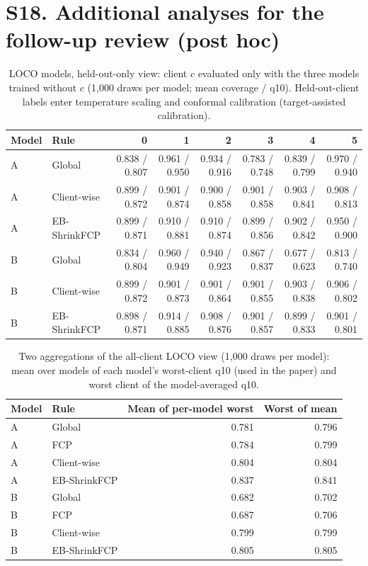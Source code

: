 \documentclass[10pt]{article}
\begin{document}
\section*{S18. Additional analyses for the follow-up review (post hoc)}
\begin{table}[!htbp]
\centering
\scriptsize
\caption{LOCO models, held-out-only view: client $c$ evaluated only with the three models trained without $c$ (1,000 draws per model; mean coverage / q10). Held-out-client labels enter temperature scaling and conformal calibration (target-assisted calibration).}
\label{tab:s18a}
\begin{tabular}{@{}llrrrrrr@{}}
\toprule
Model & Rule & 0 & 1 & 2 & 3 & 4 & 5 \\
\midrule
A & Global & 0.838 / 0.807 & 0.961 / 0.950 & 0.934 / 0.916 & 0.783 / 0.748 & 0.839 / 0.799 & 0.970 / 0.940 \\
A & Client-wise & 0.899 / 0.872 & 0.901 / 0.874 & 0.900 / 0.858 & 0.901 / 0.858 & 0.903 / 0.841 & 0.908 / 0.813 \\
A & EB-ShrinkFCP & 0.899 / 0.871 & 0.910 / 0.881 & 0.910 / 0.874 & 0.899 / 0.856 & 0.902 / 0.842 & 0.950 / 0.900 \\
\midrule
B & Global & 0.834 / 0.804 & 0.960 / 0.949 & 0.940 / 0.923 & 0.867 / 0.837 & 0.677 / 0.623 & 0.813 / 0.740 \\
B & Client-wise & 0.899 / 0.872 & 0.901 / 0.873 & 0.901 / 0.864 & 0.901 / 0.855 & 0.903 / 0.838 & 0.906 / 0.802 \\
B & EB-ShrinkFCP & 0.898 / 0.871 & 0.914 / 0.885 & 0.908 / 0.876 & 0.901 / 0.857 & 0.899 / 0.833 & 0.901 / 0.801 \\
\bottomrule
\end{tabular}
\end{table}
\begin{table}[!htbp]
\centering
\scriptsize
\caption{Two aggregations of the all-client LOCO view (1,000 draws per model): mean over models of each model's worst-client q10 (used in the paper) and worst client of the model-averaged q10.}
\label{tab:s18b}
\begin{tabular}{@{}llrr@{}}
\toprule
Model & Rule & Mean of per-model worst & Worst of mean \\
\midrule
A & Global & 0.781 & 0.796 \\
A & FCP & 0.784 & 0.799 \\
A & Client-wise & 0.804 & 0.804 \\
A & EB-ShrinkFCP & 0.837 & 0.841 \\
B & Global & 0.682 & 0.702 \\
B & FCP & 0.687 & 0.706 \\
B & Client-wise & 0.799 & 0.799 \\
B & EB-ShrinkFCP & 0.805 & 0.805 \\
\bottomrule
\end{tabular}
\end{table}
\end{document}
